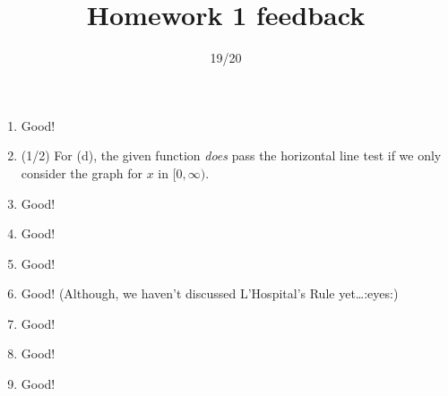\documentclass{article}
\title{Homework 1 feedback}
\author{19/20}
\date{}
\begin{document}
\maketitle
\begin{enumerate}
	\item Good!
	\item (1/2) For (d), the given function \emph{does} pass the horizontal line test if we only consider the graph for $x$ in $[0, \infty)$.
	\item Good!
	\item Good!
	\item Good!
	\item Good! (Although, we haven't discussed L'Hospital's Rule yet\ldots :eyes:)
	\item Good!
	\item Good!
	\item Good!
\end{enumerate}
\end{document}
